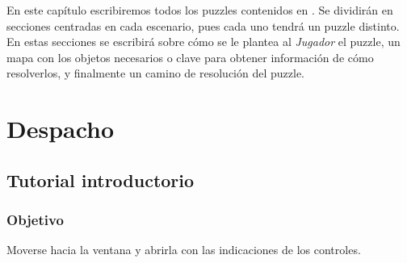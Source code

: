 En este capítulo escribiremos todos los puzzles contenidos en \nombrejuego. Se dividirán en secciones centradas en cada escenario, pues cada uno tendrá un puzzle distinto. En estas secciones se escribirá sobre cómo se le plantea al \emph{Jugador} el puzzle, un mapa con los objetos necesarios o clave para obtener información de cómo resolverlos, y finalmente un camino de resolución del puzzle.

\section{Despacho}
\subsection{Tutorial introductorio}


	\subsubsection{Objetivo} 
	Moverse hacia la ventana y abrirla con las indicaciones de los controles.
	
